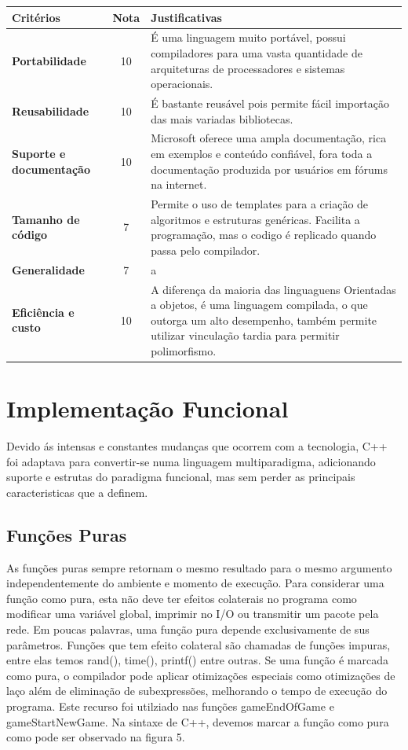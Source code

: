 \documentclass[rel_mlp]{iiufrgs}
\begin{document}
 \begin{center}
\begin{tabular}{ |p{40mm}|c|p{80mm}| }
\hline
	\textbf{Critérios} & \textbf{Nota} & \textbf{Justificativas} \\
\hline
\textbf{Portabilidade} & 10 & É uma linguagem muito portável, possui compiladores para uma vasta quantidade de arquiteturas de processadores e sistemas operacionais. \\
\textbf{Reusabilidade} & 10 & É bastante reusável pois permite fácil importação das mais variadas bibliotecas. \\
\textbf{Suporte e documentação} & 10 & Microsoft oferece uma ampla documentação, rica em exemplos e conteúdo confiável, fora toda a documentação produzida por usuários em fórums na internet. \\
\textbf{Tamanho de código} & 7 & Permite o uso de templates para a criação de algoritmos e estruturas genéricas. Facilita a programação, mas o codigo é replicado quando passa pelo compilador. \\
\textbf{Generalidade} & 7 & a \\
\textbf{Eficiência e custo} & 10 & A diferença da maioria das linguaguens Orientadas a objetos, é uma linguagem compilada, o que outorga um alto desempenho, também permite utilizar vinculação tardia para permitir polimorfismo. \\
\hline
\end{tabular}
\end{center}

\chapter{ Implementação Funcional} \label{Implementação Funcional} 

Devido ás intensas e constantes mudanças que ocorrem com a tecnologia, C++ foi adaptava para convertir-se numa linguagem multiparadigma, adicionando suporte e estrutas do paradigma funcional, mas sem perder as principais caracteristicas que a definem. 

 \section{Funções Puras}
	As funções puras sempre retornam o mesmo resultado para o mesmo argumento independentemente do ambiente e momento de execução. Para considerar uma função como pura, esta não deve ter efeitos colaterais no programa como modificar uma variável global, imprimir no I/O ou transmitir um pacote pela rede. Em poucas palavras, uma função pura depende exclusivamente de sus parâmetros.
	Funções que tem efeito colateral são chamadas de funções impuras, entre elas temos rand(), time(), printf() entre outras.
	Se uma função é marcada como pura, o compilador pode aplicar otimizações especiais como otimizações de laço além de eliminação de subexpressões, melhorando o tempo de execução do programa.
	Este recurso foi utilziado nas funções gameEndOfGame e gameStartNewGame. Na sintaxe de C++, devemos marcar a função como pura como pode ser observado na figura 5. 
	
\end{document}
